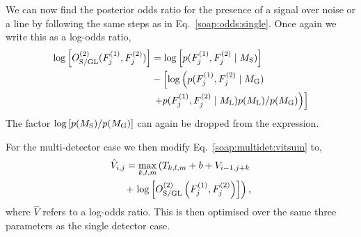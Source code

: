 %
We can now find the posterior odds ratio for the presence of a signal over noise or a line by following the same steps as in Eq.~\ref{soap:odds:single}. Once again we write this as a log-odds ratio,
\begin{equation}
\begin{split}
\label{soap:logodds}
\log\left[ O^{(2)}_{\rm{S/GL}}(F^{(1)}_{j},F^{(2)}_{j})\right] &=  \log\left[ p(F^{(1)}_{j},F^{(2)}_{j} \mid M_{\rm{S}}) \right] \\
&- \left[ \log\left( p(F^{(1)}_{j},F^{(2)}_{j}\mid M_{\rm{G}}) \right. \right. \\
&\left.\left.+  p(F^{(1)}_{j},F^{(2)}_{j}\mid M_{\rm{L}})p(M_{\rm{L}})/p(M_{\rm{G}})\right) \right]
\end{split}
\end{equation}
The factor $\log\left[ p(M_{\rm{S}})/p(M_{\rm{G}})\right]$ can again be dropped from the expression.

For the multi-detector case we then modify Eq.~\ref{soap:multidet:vitsum} to,
\begin{equation}
\begin{split}
\label{soap:las:stat:multi}
\hat{V}_{i,j} = \max_{k,l,m}\left(T_{k,l,m} + b + V_{i-1,j+k}   \right. \\
 + \left.  \log\left[O^{(2)}_{\rm{S/GL}}\left(F^{(1)}_{j},F^{(2)}_{j}\right)\right]\right),
\end{split}
\end{equation}
%
where $\hat{V}$ refers to a log-odds ratio.
This is then optimised over the same three parameters as the single detector case.

